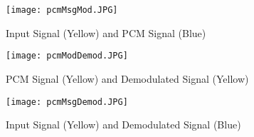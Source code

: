 \begin{figure}[H]
    \centering
    \begin{minipage}{0.45\linewidth}
        \centering
        \texttt{[image: pcmMsgMod.JPG]}
        \caption{Input Signal (Yellow) and PCM Signal (Blue)}
        \label{fig:input_pcm}
    \end{minipage}
    \hfill
    \begin{minipage}{0.45\linewidth}
        \centering
        \texttt{[image: pcmModDemod.JPG]}
        \caption{PCM Signal (Yellow) and Demodulated Signal (Yellow)}
        \label{fig:pcm_demod}
    \end{minipage}
    \vspace{1em}
    \begin{minipage}{0.45\linewidth}
        \centering
        \texttt{[image: pcmMsgDemod.JPG]}
        \caption{Input Signal (Yellow) and Demodulated Signal (Blue)}
        \label{fig:input_demod}
    \end{minipage}
\end{figure}
